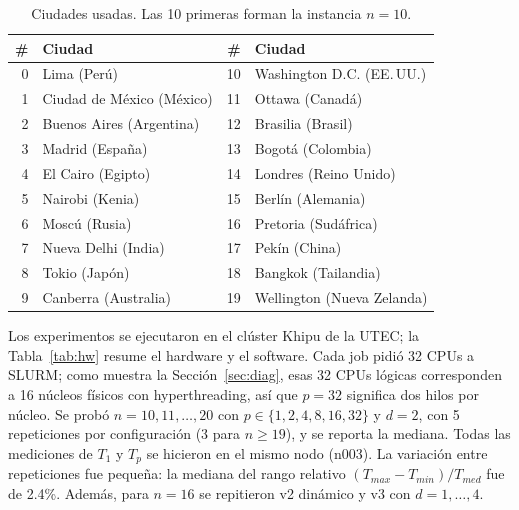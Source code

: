 \documentclass[12pt,a4paper]{article}
\begin{document}
\begin{table}[H]
\centering
\caption{Ciudades usadas. Las 10 primeras forman la instancia $n=10$.}
\label{tab:ciudades}
\small
\begin{tabular}{rl@{\hspace{2em}}rl}
\toprule
\# & Ciudad & \# & Ciudad \\
\midrule
0 & Lima (Perú) & 10 & Washington D.C. (EE.\,UU.) \\
1 & Ciudad de México (México) & 11 & Ottawa (Canadá) \\
2 & Buenos Aires (Argentina) & 12 & Brasilia (Brasil) \\
3 & Madrid (España) & 13 & Bogotá (Colombia) \\
4 & El Cairo (Egipto) & 14 & Londres (Reino Unido) \\
5 & Nairobi (Kenia) & 15 & Berlín (Alemania) \\
6 & Moscú (Rusia) & 16 & Pretoria (Sudáfrica) \\
7 & Nueva Delhi (India) & 17 & Pekín (China) \\
8 & Tokio (Japón) & 18 & Bangkok (Tailandia) \\
9 & Canberra (Australia) & 19 & Wellington (Nueva Zelanda) \\
\bottomrule
\end{tabular}
\end{table}

Los experimentos se ejecutaron en el clúster Khipu de la UTEC; la Tabla~\ref{tab:hw} resume el hardware y el software. Cada job pidió 32 CPUs a SLURM; como muestra la Sección~\ref{sec:diag}, esas 32 CPUs lógicas corresponden a 16 núcleos físicos con hyperthreading, así que $p=32$ significa dos hilos por núcleo. Se probó $n = 10, 11, \dots, 20$ con $p \in \{1, 2, 4, 8, 16, 32\}$ y $d=2$, con 5 repeticiones por configuración (3 para $n \ge 19$), y se reporta la mediana. Todas las mediciones de $T_1$ y $T_p$ se hicieron en el mismo nodo (n003). La variación entre repeticiones fue pequeña: la mediana del rango relativo $(T_{max}-T_{min})/T_{med}$ fue de 2.4\%. Además, para $n=16$ se repitieron v2 dinámico y v3 con $d = 1, \dots, 4$.
\end{document}
